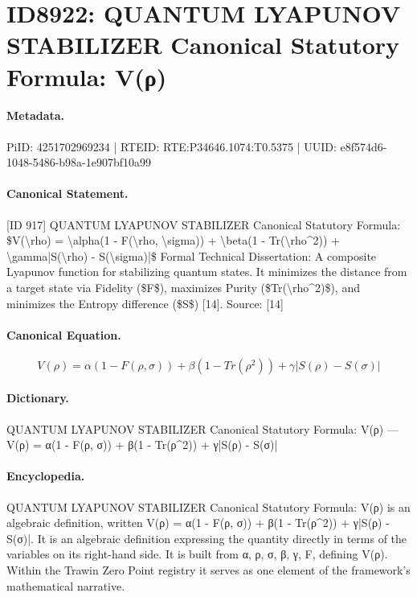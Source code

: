 \section*{ID8922: QUANTUM LYAPUNOV STABILIZER Canonical Statutory Formula: V(ρ)}
\paragraph{Metadata.}
PiID: 4251702969234 | RTEID: RTE:P34646.1074:T0.5375 | UUID: e8f574d6-1048-5486-b98a-1e907bf10a99

\paragraph{Canonical Statement.}
[ID 917] QUANTUM LYAPUNOV STABILIZER Canonical Statutory Formula: \$V(\textbackslash{}rho) = \textbackslash{}alpha(1 - F(\textbackslash{}rho, \textbackslash{}sigma)) + \textbackslash{}beta(1 - Tr(\textbackslash{}rho\textasciicircum{}2)) + \textbackslash{}gamma|S(\textbackslash{}rho) - S(\textbackslash{}sigma)|\$ Formal Technical Dissertation: A composite Lyapunov function for stabilizing quantum states. It minimizes the distance from a target state via Fidelity (\$F\$), maximizes Purity (\$Tr(\textbackslash{}rho\textasciicircum{}2)\$), and minimizes the Entropy difference (\$S\$) [14]. Source: [14]

\paragraph{Canonical Equation.}
\[
V(\rho) = \alpha(1 - F(\rho, \sigma)) + \beta(1 - Tr(\rho^2)) + \gamma|S(\rho) - S(\sigma)|
\]

\paragraph{Dictionary.}
QUANTUM LYAPUNOV STABILIZER Canonical Statutory Formula: V(ρ) — V(ρ) = α(1 - F(ρ, σ)) + β(1 - Tr(ρ\textasciicircum{}2)) + γ|S(ρ) - S(σ)|

\paragraph{Encyclopedia.}
QUANTUM LYAPUNOV STABILIZER Canonical Statutory Formula: V(ρ) is an algebraic definition, written V(ρ) = α(1 - F(ρ, σ)) + β(1 - Tr(ρ\textasciicircum{}2)) + γ|S(ρ) - S(σ)|. It is an algebraic definition expressing the quantity directly in terms of the variables on its right-hand side. It is built from α, ρ, σ, β, γ, F, defining V(ρ). Within the Trawin Zero Point registry it serves as one element of the framework's mathematical narrative.
